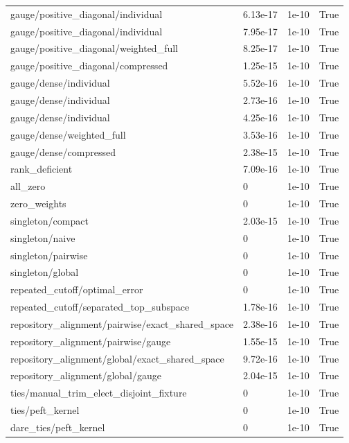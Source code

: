 \begin{tabular}{llll}
gauge/positive\_diagonal/individual & 6.13e-17 & 1e-10 & True \\
gauge/positive\_diagonal/individual & 7.95e-17 & 1e-10 & True \\
gauge/positive\_diagonal/weighted\_full & 8.25e-17 & 1e-10 & True \\
gauge/positive\_diagonal/compressed & 1.25e-15 & 1e-10 & True \\
gauge/dense/individual & 5.52e-16 & 1e-10 & True \\
gauge/dense/individual & 2.73e-16 & 1e-10 & True \\
gauge/dense/individual & 4.25e-16 & 1e-10 & True \\
gauge/dense/weighted\_full & 3.53e-16 & 1e-10 & True \\
gauge/dense/compressed & 2.38e-15 & 1e-10 & True \\
rank\_deficient & 7.09e-16 & 1e-10 & True \\
all\_zero & 0 & 1e-10 & True \\
zero\_weights & 0 & 1e-10 & True \\
singleton/compact & 2.03e-15 & 1e-10 & True \\
singleton/naive & 0 & 1e-10 & True \\
singleton/pairwise & 0 & 1e-10 & True \\
singleton/global & 0 & 1e-10 & True \\
repeated\_cutoff/optimal\_error & 0 & 1e-10 & True \\
repeated\_cutoff/separated\_top\_subspace & 1.78e-16 & 1e-10 & True \\
repository\_alignment/pairwise/exact\_shared\_space & 2.38e-16 & 1e-10 & True \\
repository\_alignment/pairwise/gauge & 1.55e-15 & 1e-10 & True \\
repository\_alignment/global/exact\_shared\_space & 9.72e-16 & 1e-10 & True \\
repository\_alignment/global/gauge & 2.04e-15 & 1e-10 & True \\
ties/manual\_trim\_elect\_disjoint\_fixture & 0 & 1e-10 & True \\
ties/peft\_kernel & 0 & 1e-10 & True \\
dare\_ties/peft\_kernel & 0 & 1e-10 & True \\
\hline
\end{tabular}
